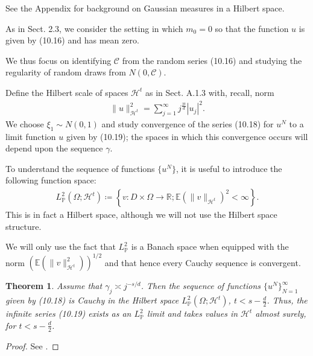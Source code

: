 \documentclass[oneside,11pt]{book}
\numberwithin{equation}{section}
\newtheorem{theorem}{Theorem}[section]
\begin{document}
See the Appendix for background on Gaussian measures in a Hilbert space.

As in Sect. 2.3, we consider the setting in which $m_0 = 0$ so that the function $u$ is given by (10.16) and has mean zero.

We thus focus on identifying $\mathcal{C}$ from the random series (10.16) and studying the regularity of random draws from $N(0,\mathcal{C})$.

%
Define the Hilbert scale of spaces $\mathcal{H}^t$ as in Sect. A.1.3 with, recall, norm
\begin{align*}
    \|u\|_{\mathcal{H}^t}^2 = \sum_{j=1}^\infty j^{\frac{2t}{d}}|u_j|^2.
\end{align*}
We choose $\xi_1\sim N(0,1)$ and study convergence of the series (10.18) for $u^N$ to a limit function $u$ given by (10.19); the spaces in which this convergence occurs will depend upon the sequence $\gamma$.

To understand the sequence of functions $\{u^N\}$, it is useful to introduce the following function space:
\begin{align*}
    L_{\mathbb{P}}^2(\Omega;\mathcal{H}^t)\coloneqq\left\{v:D\times\Omega\to\mathbb{R};\mathbb{E}(\|v\|_{\mathcal{H}^t})^2 < \infty\right\}.
\end{align*}
This is in fact a Hilbert space, although we will not use the Hilbert space structure.

We will only use the fact that $L_{\mathbb{P}}^2$ is a Banach space when equipped with the norm $(\mathbb{E}(\|v\|_{\mathcal{H}^t}^2))^{1/2}$ and that hence every Cauchy sequence is convergent.

\begin{theorem}
    Assume that $\gamma_j\asymp j^{-s/d}$. Then the sequence of functions $\{u^N\}_{N=1}^\infty$ given by (10.18) is Cauchy in the Hilbert space $L_{\mathbb{P}}^2(\Omega;\mathcal{H}^t)$, $t < s - \frac{d}{2}$. Thus, the infinite series (10.19) exists as an $L_{\mathbb{P}}^2$ limit and takes values in $\mathcal{H}^t$ almost surely, for $t < s - \frac{d}{2}$.
\end{theorem}

\begin{proof}
    See \cite[p. 331]{Dashti_Stuart2017}.
\end{proof}
\end{document}
